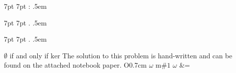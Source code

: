 \usepackage{amsmath}
\usepackage{amssymb}
\usepackage{amsthm}
\usepackage{bm}
\usepackage{enumitem}
\usepackage{float}
\usepackage{graphicx}
\usepackage[procnames]{listings}
\usepackage{mathrsfs}  %
\usepackage{mathtools}
\usepackage{parskip}
\usepackage{xparse}

\graphicspath{ {./img/} }


\newtheorem{theorem}{Theorem}[section]
\newtheorem{corollary}{Corollary}[theorem]
\newtheorem{lemma}{Lemma}

%
   {7pt}%
   {7pt}%
   {}%
   {}%
   {\bfseries}%
   {:}%
   {.5em}%
   {}

%
   {7pt}%
   {7pt}%
   {}%
   {}%
   {\bfseries}%
   {.}%
   {.5em}%
   {}

%
   {7pt}%
   {7pt}%
   {}%
   {}%
   {\itshape}%
   {.}%
   {.5em}%
   {}

\theoremstyle{case}
\newtheorem{case}{Case}

\theoremstyle{claim}
\newtheorem*{claim}{Claim}

\theoremstyle{remark}
\newtheorem*{remark}{Remark}

\makeatletter
\newcommand*{\declarecommand}{%
    \@star@or@long\declare@command
}
\newcommand*{\declare@command}[1]{%
    \provide@command{#1}{}%
    \RenewDocumentCommand{#1}%
}
\makeatother

\renewcommand{\a}{\alpha}
\newcommand{\Bythrm}[1]{By Theorem #1 of the text}
\renewcommand{\b}{\beta}
\newcommand{\bythrm}[1]{by Theorem #1 of the text}
\newcommand{\C}{\mathbb{C}}
\newcommand{\cC}{\mathcal{C}}
\newcommand{\cN}{\mathcal{N}}
\newcommand{\cR}{\mathcal{R}}
\newcommand{\cQ}{\mathcal{Q}}
\newcommand{\cZ}{\mathcal{Z}}
\renewcommand{\cal}[1]{\mathcal{#1}}
\newcommand{\com}[1]{\text{\scriptsize(#1)}}
\renewcommand{\d}{\delta}
\newcommand{\e}{\ensuremath{\epsilon}}
\declarecommand{\es}{}{\ensuremath{\emptyset}}
\newcommand{\h}[1]{\ensuremath{\hat{#1}}}
\declarecommand{\iff}{}{if and only if}
\renewcommand{\l}{\ell}
\declarecommand{\ker}{}{\ensuremath{\text{ker}}}
\newcommand{\la}{\leftarrow}
\newcommand{\N}{\mathbb{N}}
\declarecommand{\nb}{}{The solution to this problem is hand-written and can be found on the attached notebook paper.}
\declarecommand{\novs}{O{0.7cm}}{\vspace{-#1}}
\newcommand\numberthis{\addtocounter{equation}{1}\tag{\theequation}}
\declarecommand{\o}{}{\ensuremath{\omega}}
\newcommand{\R}{\mathbb{R}}
\newcommand{\ra}{\rightarrow}
\newcommand{\s}[1]{\ensuremath{\{#1\}}}
\newcommand{\set}[1]{\ensuremath{\{#1\}}}
\newcommand{\seq}[1]{\left\{#1\right\}_{n=1}^{\infty}}
\newcommand{\struct}[1]{\langle #1 \rangle}
\newcommand{\st}[1]{\ensuremath{\langle #1 \rangle}}
\newcommand{\sub}{\ensuremath{\subset}}
\newcommand{\sube}{\ensuremath{\subseteq}}
\renewcommand{\t}{\theta}
\declarecommand{\tx}{m}{\ensuremath{\text{#1}}}
\newcommand{\vphi}{\varphi}
\declarecommand{\w}{}{\ensuremath{\omega}}
\newcommand{\Q}{\mathbb{Q}}
\newcommand{\Z}{\mathbb{Z}}
\declarecommand{\=}{}{&=}

